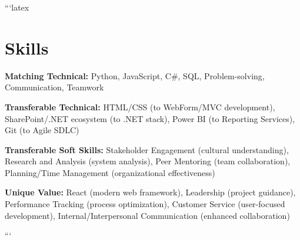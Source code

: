 ```latex
\section{Skills}
\begin{onecolentry}
\begin{highlights}
\item \textbf{Matching Technical:} Python, JavaScript, C\#, SQL, Problem-solving, Communication, Teamwork
\item \textbf{Transferable Technical:} HTML/CSS (to WebForm/MVC development), SharePoint/.NET ecosystem (to .NET stack), Power BI (to Reporting Services), Git (to Agile SDLC)
\item \textbf{Transferable Soft Skills:} Stakeholder Engagement (cultural understanding), Research and Analysis (system analysis), Peer Mentoring (team collaboration), Planning/Time Management (organizational effectiveness)
\item \textbf{Unique Value:} React (modern web framework), Leadership (project guidance), Performance Tracking (process optimization), Customer Service (user-focused development), Internal/Interpersonal Communication (enhanced collaboration)
\end{highlights}
\end{onecolentry}
```